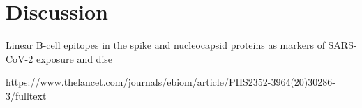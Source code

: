 \chapter{Discussion}

Linear B-cell epitopes in the spike and nucleocapsid proteins as markers of SARS-CoV-2 exposure and dise


https://www.thelancet.com/journals/ebiom/article/PIIS2352-3964(20)30286-3/fulltext


\textcolor{lightgray}{\lipsum[1-5]}
